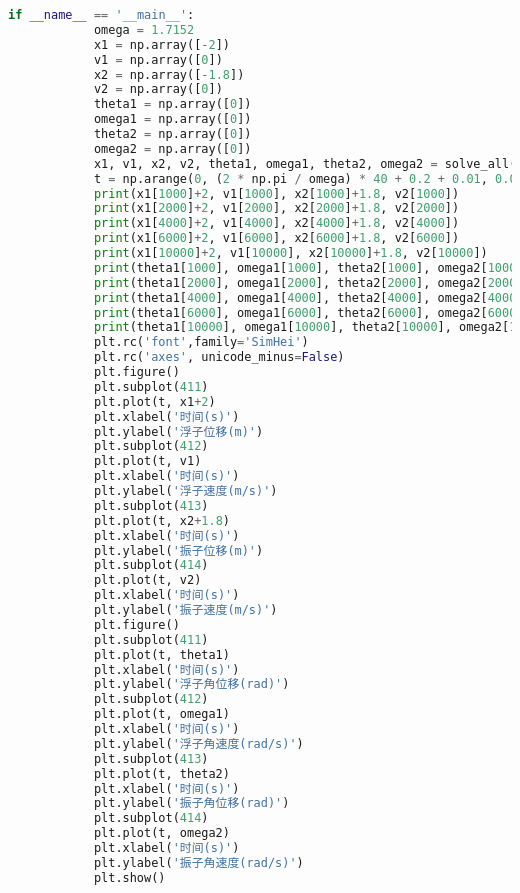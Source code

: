 \documentclass[withoutpreface,bwprint]{cumcmthesis} %
\begin{document}
\begin{appendices}
\begin{lstlisting}[language=python]
        if __name__ == '__main__':
            omega = 1.7152
            x1 = np.array([-2])
            v1 = np.array([0])
            x2 = np.array([-1.8])
            v2 = np.array([0])
            theta1 = np.array([0])
            omega1 = np.array([0])
            theta2 = np.array([0])
            omega2 = np.array([0])
            x1, v1, x2, v2, theta1, omega1, theta2, omega2 = solve_all(x1, v1, x2, v2, theta1, omega1, theta2, omega2, m3=1028.876, J3=7001.914, omega=1.7152, f=3640, L=1690, b1=683.4558, B1=654.3383 * 2, b0=10000, B0=1000)
            t = np.arange(0, (2 * np.pi / omega) * 40 + 0.2 + 0.01, 0.01)
            print(x1[1000]+2, v1[1000], x2[1000]+1.8, v2[1000])
            print(x1[2000]+2, v1[2000], x2[2000]+1.8, v2[2000])
            print(x1[4000]+2, v1[4000], x2[4000]+1.8, v2[4000])
            print(x1[6000]+2, v1[6000], x2[6000]+1.8, v2[6000])
            print(x1[10000]+2, v1[10000], x2[10000]+1.8, v2[10000])
            print(theta1[1000], omega1[1000], theta2[1000], omega2[1000])
            print(theta1[2000], omega1[2000], theta2[2000], omega2[2000])
            print(theta1[4000], omega1[4000], theta2[4000], omega2[4000])
            print(theta1[6000], omega1[6000], theta2[6000], omega2[6000])
            print(theta1[10000], omega1[10000], theta2[10000], omega2[10000])
            plt.rc('font',family='SimHei')
            plt.rc('axes', unicode_minus=False)
            plt.figure()
            plt.subplot(411)
            plt.plot(t, x1+2)
            plt.xlabel('时间(s)')
            plt.ylabel('浮子位移(m)')
            plt.subplot(412)
            plt.plot(t, v1)
            plt.xlabel('时间(s)')
            plt.ylabel('浮子速度(m/s)')
            plt.subplot(413)
            plt.plot(t, x2+1.8)
            plt.xlabel('时间(s)')
            plt.ylabel('振子位移(m)')
            plt.subplot(414)
            plt.plot(t, v2)
            plt.xlabel('时间(s)')
            plt.ylabel('振子速度(m/s)')
            plt.figure()
            plt.subplot(411)
            plt.plot(t, theta1)
            plt.xlabel('时间(s)')
            plt.ylabel('浮子角位移(rad)')
            plt.subplot(412)
            plt.plot(t, omega1)
            plt.xlabel('时间(s)')
            plt.ylabel('浮子角速度(rad/s)')
            plt.subplot(413)
            plt.plot(t, theta2)
            plt.xlabel('时间(s)')
            plt.ylabel('振子角位移(rad)')
            plt.subplot(414)
            plt.plot(t, omega2)
            plt.xlabel('时间(s)')
            plt.ylabel('振子角速度(rad/s)')
            plt.show()
        \end{lstlisting}


\end{appendices}
\end{document}
